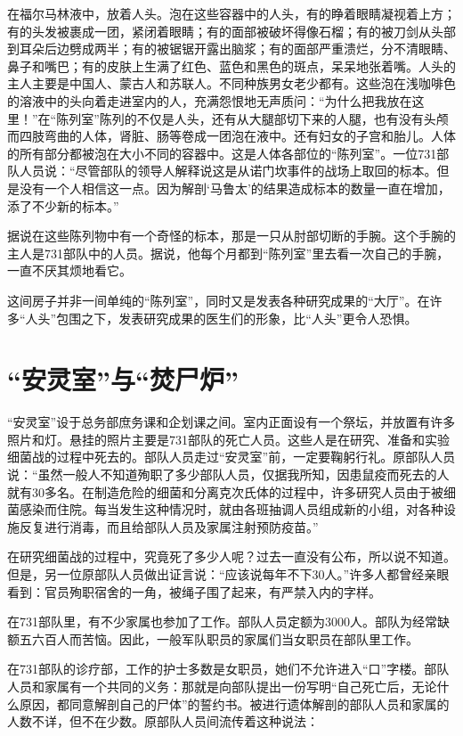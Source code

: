 \documentclass[a4paper,12pt,UTF8,twoside]{ctexbook}
\begin{document}
在福尔马林液中，放着人头。泡在这些容器中的人头，有的睁着眼睛凝视着上方；有的头发被裹成一团，紧闭着眼睛；有的面部被破坏得像石榴；有的被刀剑从头部到耳朵后边劈成两半；有的被锯锯开露出脑浆；有的面部严重溃烂，分不清眼睛、鼻子和嘴巴；有的皮肤上生满了红色、蓝色和黑色的斑点，呆呆地张着嘴。人头的主人主要是中国人、蒙古人和苏联人。不同种族男女老少都有。这些泡在浅咖啡色的溶液中的头向着走进室内的人，充满怨恨地无声质问：“为什么把我放在这里！”在“陈列室”陈列的不仅是人头，还有从大腿部切下来的人腿，也有没有头颅而四肢弯曲的人体，肾脏、肠等卷成一团泡在液中。还有妇女的子宫和胎儿。人体的所有部分都被泡在大小不同的容器中。这是人体各部位的“陈列室”。一位731部队人员说：“尽管部队的领导人解释说这是从诺门坎事件的战场上取回的标本。但是没有一个人相信这一点。因为解剖‘马鲁太’的结果造成标本的数量一直在增加，添了不少新的标本。”

据说在这些陈列物中有一个奇怪的标本，那是一只从肘部切断的手腕。这个手腕的主人是731部队中的人员。据说，他每个月都到“陈列室”里去看一次自己的手腕，一直不厌其烦地看它。

这间房子并非一间单纯的“陈列室”，同时又是发表各种研究成果的“大厅”。在许多“人头”包围之下，发表研究成果的医生们的形象，比“人头”更令人恐惧。

\section{“安灵室”与“焚尸炉”}

“安灵室”设于总务部庶务课和企划课之间。室内正面设有一个祭坛，并放置有许多照片和灯。悬挂的照片主要是731部队的死亡人员。这些人是在研究、准备和实验细菌战的过程中死去的。部队人员走过“安灵室”前，一定要鞠躬行礼。原部队人员说：“虽然一般人不知道殉职了多少部队人员，仅据我所知，因患鼠疫而死去的人就有30多名。在制造危险的细菌和分离克次氏体的过程中，许多研究人员由于被细菌感染而住院。每当发生这种情况时，就由各班抽调人员组成新的小组，对各种设施反复进行消毒，而且给部队人员及家属注射预防疫苗。”

在研究细菌战的过程中，究竟死了多少人呢？过去一直没有公布，所以说不知道。但是，另一位原部队人员做出证言说：“应该说每年不下30人。”许多人都曾经亲眼看到：官员殉职宿舍的一角，被绳子围了起来，有严禁入内的字样。

在731部队里，有不少家属也参加了工作。部队人员定额为3000人。部队为经常缺额五六百人而苦恼。因此，一般军队职员的家属们当女职员在部队里工作。

在731部队的诊疗部，工作的护士多数是女职员，她们不允许进入“口”字楼。部队人员和家属有一个共同的义务：那就是向部队提出一份写明“自己死亡后，无论什么原因，都同意解剖自己的尸体”的誓约书。被进行遗体解剖的部队人员和家属的人数不详，但不在少数。原部队人员间流传着这种说法：
\end{document}
